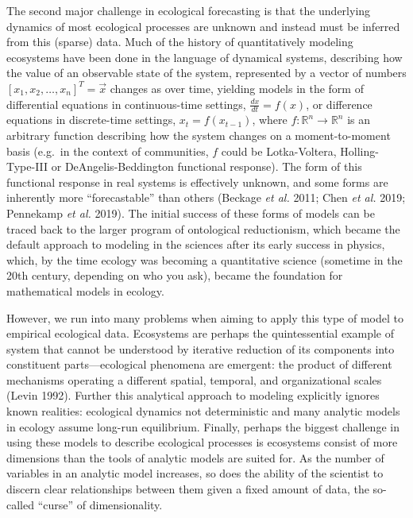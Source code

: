 \documentclass[10pt,oneside]{article}
\begin{document}
The second major challenge in ecological forecasting is that the
underlying dynamics of most ecological processes are unknown and instead
must be inferred from this (sparse) data. Much of the history of
quantitatively modeling ecosystems have been done in the language of
dynamical systems, describing how the value of an observable state of
the system, represented by a vector of numbers
\([x_1, x_2, \dots, x_n]^T = \vec{x}\) changes as over time, yielding
models in the form of differential equations in continuous-time
settings, \(\frac{dx}{dt} = f(x)\), or difference equations in
discrete-time settings, \(x_t = f(x_{t-1})\), where
\(f:\mathbb{R}^n \to \mathbb{R}^n\) is an arbitrary function describing
how the system changes on a moment-to-moment basis (e.g.~in the context
of communities, \(f\) could be Lotka-Voltera, Holling-Type-III or
DeAngelis-Beddington functional response). The form of this functional
response in real systems is effectively unknown, and some forms are
inherently more ``forecastable'' than others (Beckage \emph{et al.}
2011; Chen \emph{et al.} 2019; Pennekamp \emph{et al.} 2019). The
initial success of these forms of models can be traced back to the
larger program of ontological reductionism, which became the default
approach to modeling in the sciences after its early success in physics,
which, by the time ecology was becoming a quantitative science (sometime
in the 20th century, depending on who you ask), became the foundation
for mathematical models in ecology.

However, we run into many problems when aiming to apply this type of
model to empirical ecological data. Ecosystems are perhaps the
quintessential example of system that cannot be understood by iterative
reduction of its components into constituent parts---ecological
phenomena are emergent: the product of different mechanisms operating a
different spatial, temporal, and organizational scales (Levin 1992).
Further this analytical approach to modeling explicitly ignores known
realities: ecological dynamics not deterministic and many analytic
models in ecology assume long-run equilibrium. Finally, perhaps the
biggest challenge in using these models to describe ecological processes
is ecosystems consist of more dimensions than the tools of analytic
models are suited for. As the number of variables in an analytic model
increases, so does the ability of the scientist to discern clear
relationships between them given a fixed amount of data, the so-called
``curse'' of dimensionality.
\end{document}
